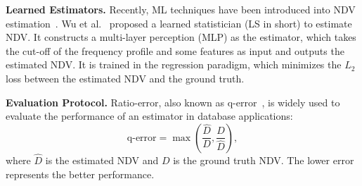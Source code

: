\noindent\textbf{Learned Estimators.}
Recently, ML techniques have been introduced into NDV estimation~\cite{ls_wu2022learning,li2024learning}. Wu et al.~\cite{ls_wu2022learning} proposed a learned statistician (LS in short) to estimate NDV. It constructs a multi-layer perception (MLP) as the estimator, which takes the cut-off of the frequency profile and some features as input and outputs the estimated NDV. It is trained in the regression paradigm, which minimizes the $L_2$ loss between the estimated NDV and the ground truth. 




\noindent\textbf{Evaluation Protocol.} 
Ratio-error, also known as q-error~\cite{q_error_moerkotte2009preventing}, is widely used to evaluate the performance of an estimator in database applications:
\begin{equation}
    \mathrm{q\text{-}error}=\max(\frac{\hat{D}}{D},\frac{D}{\hat{D}}),
    \label{eq:q-error}
\end{equation}
where $\hat{D}$ is the estimated NDV and $D$ is the ground truth NDV. The lower error represents the better performance.
